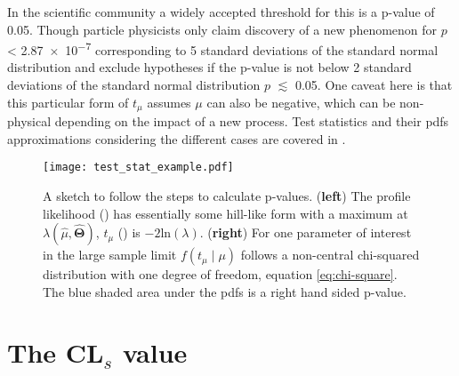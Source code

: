 In the scientific community a widely accepted threshold for this is a p-value of 0.05. Though particle physicists only claim discovery of a new phenomenon for $p$ < \qty{2.87e-7}{} corresponding to 5 standard deviations of the standard normal distribution and exclude hypotheses if the p-value is not below 2 standard deviations of the standard normal distribution $p$ $\lesssim$ \qty{0.05}{}. One caveat here is that this particular form of $t_\mu$ assumes $\mu$ can also be negative, which can be non-physical depending on the impact of a new process. Test statistics and their \acp{pdf} approximations considering the different cases are covered in \citep{cowan2011asymptotic}. 
\begin{figure}
    \centering
    \texttt{[image: test\_stat\_example.pdf]}
        \caption[]{A sketch to follow the steps to calculate p-values. (\textbf{left}) The profile likelihood () has essentially some hill-like form with a maximum at ${\lambda(\hat{\mu},\hat{\bm{\Theta}})}$, $t_\mu$ () is $-2\mathrm{ln}(\lambda)$. (\textbf{right}) For one parameter of interest in the large sample limit $f(t_\mu \mid \mu)$ follows a non-central chi-squared distribution with one degree of freedom, equation \ref{eq:chi-square}. The blue shaded area under the \acp{pdf} is a right hand sided p-value.}
    \label{fig:test_stat_example}    
\end{figure}

\section{The CL$_s$ value}\label{sec:cls}


